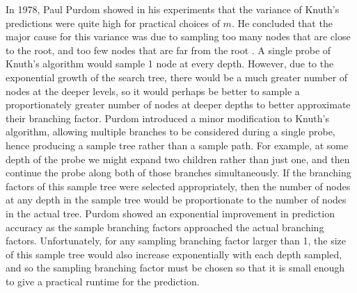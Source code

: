 \documentclass{article}
\begin{document}
In 1978, Paul Purdom showed in his experiments that the variance of Knuth's predictions were quite high for practical choices of \(m\).
He concluded that the major cause for this variance was due to sampling too many nodes that are close to the root,
and too few nodes that are far from the root  \cite{purdom1978tree}. A single probe of Knuth's algorithm would sample 1 node at every depth.
However, due to the exponential growth of the search tree, there would be a much greater
number of nodes at the deeper levels, so it would perhaps be better to sample a proportionately greater number of nodes at deeper depths
to better approximate their branching factor.
Purdom introduced a minor modification to Knuth's algorithm, allowing multiple branches to be considered
during a single probe, hence producing a sample tree rather than a sample path. For example, at some depth of the probe
we might expand two children rather than just one, and then continue the probe along both of those
branches simultaneously.
If the branching factors of this sample tree were selected appropriately,
then the number of nodes at any depth in the sample tree would be proportionate to the number of nodes in the actual tree.
Purdom showed an exponential improvement in prediction accuracy as the sample branching factors approached the actual branching factors.
Unfortunately, for any sampling branching factor larger than 1, the size of this sample tree would also increase exponentially with each depth sampled, and so the sampling branching factor must be chosen so that it is small enough to give a practical runtime for the prediction.
\\
\end{document}
